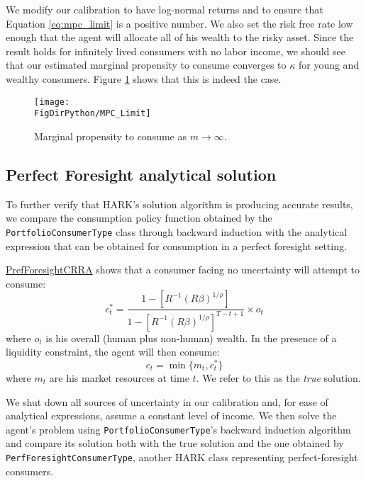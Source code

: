 \documentclass[../CGMPortfolio.tex]{subfiles}
\begin{document}
We modify our calibration to have log-normal returns and to ensure that 
Equation \ref{eq:mpc_limit} is a positive number. We also set the risk free
rate low enough that the agent will allocate all of his wealth to the risky
asset. Since the result holds for infinitely lived consumers with no labor 
income, we should see that our estimated marginal propensity to consume 
converges to $\kappa$ for young and wealthy consumers. Figure \ref{fig:mpc_lim} 
shows that this is indeed the case.

\begin{figure}[h]
	\texttt{[image: \\FigDirPython/MPC\_Limit]}
	\caption{Marginal propensity to consume as $m \rightarrow \infty$.}
	\label{fig:mpc_lim}
\end{figure}

\subsection{Perfect Foresight analytical solution}

To further verify that HARK's solution algorithm is producing accurate results,
we compare the consumption policy function obtained by the
\texttt{PortfolioConsumerType} class through backward induction with the
analytical expression that can be obtained for consumption in a perfect
foresight setting.

\href{http://www.econ2.jhu.edu/people/ccarroll/public/LectureNotes/Consumption/PerfForesightCRRA/}{PrefForesightCRRA}
shows that a consumer facing no uncertainty will attempt to consume:
\begin{equation}
	c^*_t = \frac{1 - \left[ R^{-1} \left( R \beta \right)^{1/\rho}\right]}{1 - 
	\left[ R^{-1} \left( R \beta \right)^{1/\rho}\right]^{T-t+1}}\times o_t
\end{equation}
where $o_t$ is his overall (human plus non-human) wealth. In the presence of a liquidity constraint, the agent will then consume:
\begin{equation}
	c_t = \min \{ m_t , c^*_t\}
\end{equation}
where $m_t$ are his market resources at time $t$. We refer to this as the 
\emph{true} solution.

We shut down all sources of uncertainty in our calibration and, for ease of
analytical expressions, assume a constant level of income. We then solve the
agent's problem using \texttt{PortfolioConsumerType}'s backward induction
algorithm and compare its solution both with the true solution and the one
obtained by \texttt{PerfForesightConsumerType}, another HARK class representing perfect-foresight consumers.
\end{document}
